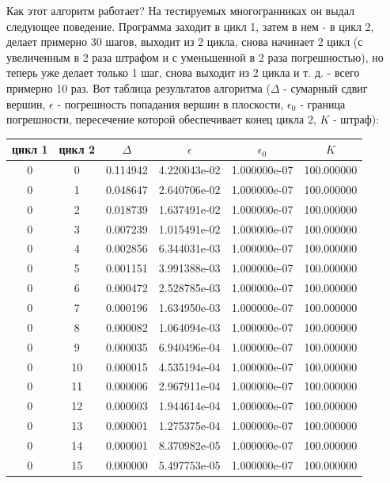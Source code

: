 \documentclass[a4paper,12pt, titlepage]{article}
\begin{document}
\begin{flushleft}
Как этот алгоритм работает? На тестируемых многогранниках он выдал следующее поведение. Программа заходит в цикл 1, затем в нем - 
в цикл 2, делает примерно 30 шагов, выходит из 2 цикла, снова начинает 2 цикл (с увеличенным в 2 раза штрафом и с уменьшенной в 
2 раза погрешностью), но теперь уже делает только 1 шаг, снова выходит из 2 цикла и т. д. - всего примерно 10 раз.
Вот таблица результатов алгоритма ($\Delta$ - сумарный сдвиг вершин, $\epsilon$ - погрешность попадания вершин в плоскости,
$\epsilon_{0}$ - граница погрешности, пересечение которой обеспечивает конец цикла 2, $K$ - штраф):\\
\begin{tabular}{|c|c|c|c|c|c|}
\hline
 цикл 1 & цикл 2 & $\Delta$ & $\epsilon$& $\epsilon_{0}$&  $K$\\
\hline
 0 & 0 & 0.114942 & 4.220043e-02 & 1.000000e-07 & 100.000000\\
\hline
 0 & 1 & 0.048647 & 2.640706e-02 & 1.000000e-07 & 100.000000\\
\hline
 0 & 2 & 0.018739 & 1.637491e-02 & 1.000000e-07 & 100.000000\\
\hline
 0 & 3 & 0.007239 & 1.015491e-02 & 1.000000e-07 & 100.000000\\
\hline
 0 & 4 & 0.002856 & 6.344031e-03 & 1.000000e-07 & 100.000000\\
\hline
 0 & 5 & 0.001151 & 3.991388e-03 & 1.000000e-07 & 100.000000\\
\hline
 0 & 6 & 0.000472 & 2.528785e-03 & 1.000000e-07 & 100.000000\\
\hline
 0 & 7 & 0.000196 & 1.634950e-03 & 1.000000e-07 & 100.000000\\
\hline
 0 & 8 & 0.000082 & 1.064094e-03 & 1.000000e-07 & 100.000000\\
\hline
 0 & 9 & 0.000035 & 6.940496e-04 & 1.000000e-07 & 100.000000\\
\hline
 0 & 10 & 0.000015 & 4.535194e-04 & 1.000000e-07 & 100.000000\\
\hline
 0 & 11 & 0.000006 & 2.967911e-04 & 1.000000e-07 & 100.000000\\
\hline
 0 & 12 & 0.000003 & 1.944614e-04 & 1.000000e-07 & 100.000000\\
\hline
 0 & 13 & 0.000001 & 1.275375e-04 & 1.000000e-07 & 100.000000\\
\hline
 0 & 14 & 0.000001 & 8.370982e-05 & 1.000000e-07 & 100.000000\\
\hline
 0 & 15 & 0.000000 & 5.497753e-05 & 1.000000e-07 & 100.000000\\

\end{tabular}
\end{flushleft}
\end{document}
